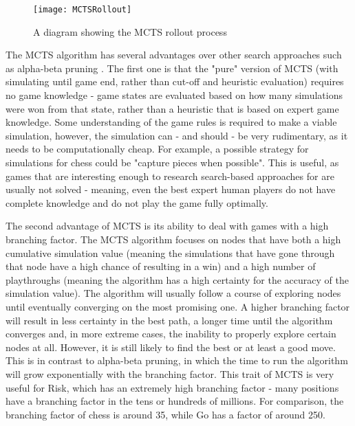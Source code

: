 \begin{figure}[H]
\texttt{[image: MCTSRollout]}
\caption{A diagram showing the MCTS rollout process}
\label{fig:MCTSRollout}
\end{figure}

The MCTS algorithm has several advantages over other search approaches such as alpha-beta pruning \cite{knuth1975analysis}. The first one is that the "pure" version of MCTS (with simulating until game end, rather than cut-off and heuristic evaluation) requires no game knowledge - game states are evaluated based on how many simulations were won from that state, rather than a heuristic that is based on expert game knowledge. Some understanding of the game rules is required to make a viable simulation, however, the simulation can - and should - be very rudimentary, as it needs to be computationally cheap. For example, a possible strategy for simulations for chess could be "capture pieces when possible". This is useful, as games that are interesting enough to research search-based approaches for are usually not solved - meaning, even the best expert human players do not have complete knowledge and do not play the game fully optimally.

The second advantage of MCTS is its ability to deal with games with a high branching factor. The MCTS algorithm focuses on nodes that have both a high cumulative simulation value (meaning the simulations that have gone through that node have a high chance of resulting in a win) and a high number of playthroughs (meaning the algorithm has a high certainty for the accuracy of the simulation value). The algorithm will usually follow a course of exploring nodes until eventually converging on the most promising one. A higher branching factor will result in less certainty in the best path, a longer time until the algorithm converges and, in more extreme cases, the inability to properly explore certain nodes at all. However, it is still likely to find the best or at least a good move. This is in contrast to alpha-beta pruning, in which the time to run the algorithm will grow exponentially with the branching factor. This trait of MCTS is very useful for Risk, which has an extremely high branching factor \cite{bauer2023artificial} - many positions have a branching factor in the tens or hundreds of millions. For comparison, the branching factor of chess is around 35, while Go has a factor of around 250.

